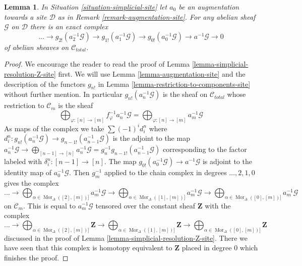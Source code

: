 \documentclass{stacks-project}
\theoremstyle{plain}
\newtheorem{lemma}[subsection]{Lemma}
\theoremstyle{definition}
\theoremstyle{remark}
\numberwithin{equation}{subsection}
\def\Mor{\mathop{\mathrm{Mor}}\nolimits}
\begin{document}
\begin{lemma}
\label{lemma-simplicial-resolution-augmentation}
In Situation \ref{situation-simplicial-site} let
$a_0$ be an augmentation towards a site $\mathcal{D}$
as in Remark \ref{remark-augmentation-site}.
For any abelian sheaf $\mathcal{G}$ on $\mathcal{D}$ 
there is an exact complex
$$
\ldots \to
g_{2!}(a_2^{-1}\mathcal{G}) \to
g_{1!}(a_1^{-1}\mathcal{G}) \to
g_{0!}(a_0^{-1}\mathcal{G}) \to
a^{-1}\mathcal{G} \to 0
$$
of abelian sheaves on $\mathcal{C}_{total}$.
\end{lemma}

\begin{proof}
We encourage the reader to read the proof of
Lemma \ref{lemma-simplicial-resolution-Z-site} first.
We will use Lemma \ref{lemma-augmentation-site} and
the description of the functors $g_{n!}$ in
Lemma \ref{lemma-restriction-to-components-site} without further mention.
In particular $g_{n!}(a_n^{-1}\mathcal{G})$ is the
sheaf on $\mathcal{C}_{total}$ whose restriction to $\mathcal{C}_m$
is the sheaf
$$
\bigoplus\nolimits_{\varphi : [n] \to [m]} f_\varphi^{-1}a_n^{-1}\mathcal{G} =
\bigoplus\nolimits_{\varphi : [n] \to [m]} a_m^{-1}\mathcal{G}
$$
As maps of the complex we take $\sum (-1)^i d^n_i$ where
$d^n_i : g_{n!}(a_n^{-1}\mathcal{G}) \to g_{n - 1!}(a_{n - 1}^{-1}\mathcal{G})$
is the adjoint to the map
$a_n^{-1}\mathcal{G} \to \bigoplus_{[n - 1] \to [n]} a_n^{-1}\mathcal{G} =
g_n^{-1}g_{n - 1!}(a_{n - 1}^{-1}\mathcal{G})$
corresponding to the factor labeled with $\delta^n_i : [n - 1] \to [n]$.
The map $g_{0!}(a_0^{-1}\mathcal{G}) \to a^{-1}\mathcal{G}$ is adjoint
to the identity map of $a_0^{-1}\mathcal{G}$.
Then $g_m^{-1}$ applied to the chain complex in degrees
$\ldots, 2, 1, 0$ gives the complex
$$
\ldots \to
\bigoplus\nolimits_{\alpha \in \Mor_\Delta([2], [m])]} a_m^{-1}\mathcal{G} \to
\bigoplus\nolimits_{\alpha \in \Mor_\Delta([1], [m])]} a_m^{-1}\mathcal{G} \to
\bigoplus\nolimits_{\alpha \in \Mor_\Delta([0], [m])]} a_m^{-1}\mathcal{G}
$$
on $\mathcal{C}_m$. This is equal to $a_m^{-1}\mathcal{G}$
tensored over the constant sheaf $\mathbf{Z}$ with the complex
$$
\ldots \to
\bigoplus\nolimits_{\alpha \in \Mor_\Delta([2], [m])]} \mathbf{Z} \to
\bigoplus\nolimits_{\alpha \in \Mor_\Delta([1], [m])]} \mathbf{Z} \to
\bigoplus\nolimits_{\alpha \in \Mor_\Delta([0], [m])]} \mathbf{Z}
$$
discussed in the proof of Lemma \ref{lemma-simplicial-resolution-Z-site}.
There we have seen that this complex is homotopy equivalent to
$\mathbf{Z}$ placed in degree $0$ which finishes the proof.
\end{proof}
\end{document}
